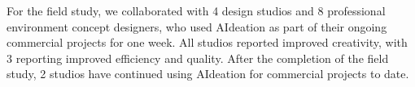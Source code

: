 
For the field study, we collaborated with 4 design studios and 8 professional environment concept designers, who used AIdeation as part of their ongoing commercial projects for one week. 
All studios reported improved creativity, with 3 reporting improved efficiency and quality.
After the completion of the field study, 2 studios have continued using AIdeation for commercial projects to date.








